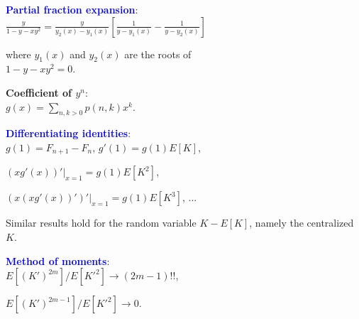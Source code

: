 \documentclass[landscape,final,columns=3]{baposter}
\begin{document}
\begin{poster}
{\begin{multicols}{2}
\begin{list}{}{\leftmargin=1em}
\vspace{-0.02in}

\item {{\textcolor{blue}{\bf{Partial fraction expansion}}}}: \\
$\frac{y}{1-y-xy^2} =\frac{y}{y_2(x)-y_1(x)}\left[\frac{1}{y-y_1(x)}-\frac{1}{y-y_2(x)}\right]$

where $y_1(x)$ and $y_2(x)$ are the roots of\\
$1-y-xy^2=0$.

{\bf{Coefficient of $y^n$}}: \\
$g(x)=\sum_{n,k>0}p(n,k)x^k$.

\vspace{-0.02in}

\item {{\textcolor{blue}{\bf{Differentiating identities}}}}: \\
$g(1)=F_{n+1}-F_n$,  $g'(1)=g(1)E[K]$,

$\left(xg'(x)\right)'|_{x=1}=g(1)E[K^2]$,

$\left(x\left(xg'(x)\right)'\right)'|_{x=1}=g(1)E[K^3]$, ...

Similar results hold for the random variable $K-E[K]$, namely the centralized $K$.

\vspace{-0.02in}

\item {{\textcolor{blue}{\bf{Method of moments}}}}: \\
$E[(K')^{2m}]/E[K'^2]\rightarrow (2m-1)!!$,

$E[(K')^{2m-1}]/E[K'^2]\rightarrow 0$.
\end{list}

\vspace{0.1em}

\end{multicols}

}

\end{poster}%
%
\end{document}
